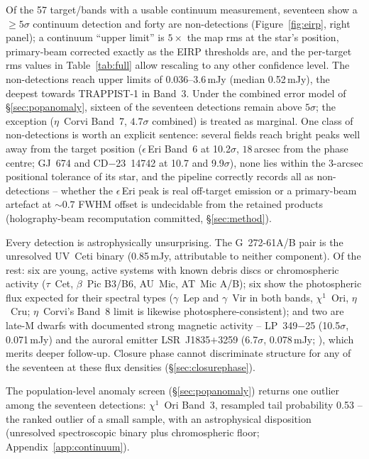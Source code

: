 \documentclass{openjournal}
\begin{document}
Of the 57 target/bands with a usable continuum measurement, seventeen
show a $\geq5\sigma$ continuum detection and forty are non-detections
(Figure~\ref{fig:eirp}, right panel); a continuum ``upper limit'' is
$5\times$ the map rms at the star's position, primary-beam corrected
exactly as the EIRP thresholds are, and the per-target rms values in
Table~\ref{tab:full} allow rescaling to any other confidence level.
The non-detections reach upper limits of 0.036--3.6\,mJy (median
0.52\,mJy), the deepest towards TRAPPIST-1 in Band~3. Under the
combined error model of \S\ref{sec:popanomaly}, sixteen of the
seventeen detections remain above $5\sigma$; the exception
($\eta$~Corvi Band~7, $4.7\sigma$ combined) is treated as marginal.
One class of non-detections is worth an explicit sentence: several
fields reach bright peaks well away from the target position
($\epsilon$\,Eri Band~6 at 10.2$\sigma$, $18$\,arcsec from the phase
centre; GJ~674 and CD$-$23~14742 at 10.7 and 9.9$\sigma$), none lies
within the $3$-arcsec positional tolerance of its star, and the
pipeline correctly records all as non-detections -- whether the
$\epsilon$\,Eri peak is real off-target emission or a primary-beam
artefact at ${\sim}0.7$ FWHM offset is undecidable from the retained
products (holography-beam recomputation committed,
\S\ref{sec:method}).

Every detection is astrophysically unsurprising. The G~272-61A/B pair
is the unresolved UV~Ceti binary (0.85\,mJy, attributable to neither
component). Of the rest: six are young, active systems with known
debris discs or chromospheric activity ($\tau$~Cet, $\beta$~Pic B3/B6,
AU~Mic, AT~Mic A/B); six show the photospheric flux expected for
their spectral types ($\gamma$~Lep and $\gamma$~Vir in both bands,
$\chi^{1}$~Ori, $\eta$~Cru; $\eta$~Corvi's Band~8 limit is
likewise photosphere-consistent); and two are late-M dwarfs with
documented strong magnetic activity -- LP~349$-$25 (10.5$\sigma$,
0.071\,mJy) and the auroral emitter LSR~J1835$+$3259 (6.7$\sigma$,
0.078\,mJy; \citealt{Hallinan2007}), which merits deeper follow-up.
Closure phase cannot discriminate structure for any of the seventeen
at these flux densities (\S\ref{sec:closurephase}).

The population-level anomaly screen (\S\ref{sec:popanomaly}) returns
one outlier among the seventeen detections: $\chi^{1}$~Ori Band~3,
resampled tail probability 0.53 -- the ranked outlier of a small
sample, with an astrophysical disposition (unresolved spectroscopic
binary plus chromospheric floor; Appendix~\ref{app:continuum}).
\end{document}
